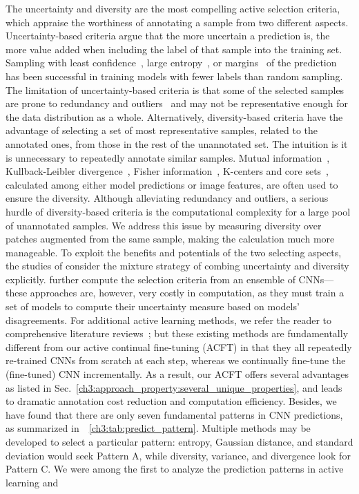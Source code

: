The uncertainty and diversity are the most compelling active selection criteria, which appraise the worthiness of annotating a sample from two different aspects. Uncertainty-based criteria argue that the more uncertain a prediction is, the more value added when including the label of that sample into the training set. Sampling with least confidence~\citep{culotta2005reducing}, large entropy~\citep{dagan1995committee,mahapatra2018efficient,shao2018deep,kuo2018cost}, or margins~\citep{scheffer2001active,balcan2007margin} of the prediction has been successful in training models with fewer labels than random sampling. The limitation of uncertainty-based criteria is that some of the selected samples are prone to redundancy and outliers~\citep{sourati2019intelligent} and may not be representative enough for the data distribution as a whole. Alternatively, diversity-based criteria have the advantage of selecting a set of most representative samples, related to the annotated ones, from those in the rest of the unannotated set. The intuition is it is unnecessary to repeatedly annotate similar samples. Mutual information~\citep{li2013adaptive,gal2017deep}, Kullback-Leibler divergence~\citep{kulick2014active,mccallumzy1998employing}, Fisher information~\citep{sourati2018active,sourati2019intelligent}, K-centers and core sets~\citep{sener2017active}, calculated among either model predictions or image features, are often used to ensure the diversity. Although alleviating redundancy and outliers, a serious hurdle of diversity-based criteria is the computational complexity for a large pool of unannotated samples. We address this issue by measuring diversity over patches augmented from the same sample, making the calculation much more manageable. To exploit the benefits and potentials of the two selecting aspects, the studies of \citet{wang2018deep,ozdemir2018active,mahapatra2018efficient,shui2020deep} consider the mixture strategy of combing uncertainty and diversity explicitly. \citet{yang2017suggestive,beluch2018power,kuo2018cost} further compute the selection criteria from an ensemble of CNNs---these approaches are, however, very costly in computation, as they must train a set of models to compute their uncertainty measure based on models' disagreements. For additional active learning methods, we refer the reader to comprehensive literature reviews~\citep{tajbakhsh2020embracing,munjal2020towards,hino2020active,ren2020survey}; but these existing methods are fundamentally different from our active continual fine-tuning (ACFT) in that they all repeatedly re-trained CNNs from scratch at each step, whereas we continually fine-tune the (fine-tuned) CNN incrementally. As a result, our ACFT offers several advantages as listed in Sec.~\ref{ch3:approach_property:several_unique_properties}, and leads to dramatic annotation cost reduction and computation efficiency. Besides, we have found that there are only seven fundamental patterns in CNN predictions, as summarized in~\tablename~\ref{ch3:tab:predict_pattern}. Multiple methods may be developed to select a particular pattern: entropy, Gaussian distance, and standard deviation would seek Pattern A, while diversity, variance, and divergence look for Pattern C. We were among the first to analyze the prediction patterns in active learning and 